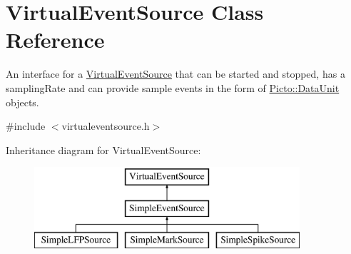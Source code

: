\hypertarget{class_virtual_event_source}{\section{Virtual\-Event\-Source Class Reference}
\label{class_virtual_event_source}
}


An interface for a \hyperlink{class_virtual_event_source}{Virtual\-Event\-Source} that can be started and stopped, has a sampling\-Rate and can provide sample events in the form of \hyperlink{class_picto_1_1_data_unit}{Picto\-::\-Data\-Unit} objects.  




{\ttfamily \#include $<$virtualeventsource.\-h$>$}

Inheritance diagram for Virtual\-Event\-Source\-:\begin{figure}[H]
\begin{center}
\leavevmode
\includegraphics[height=3.000000cm]{class_virtual_event_source}
\end{center}
\end{figure}
